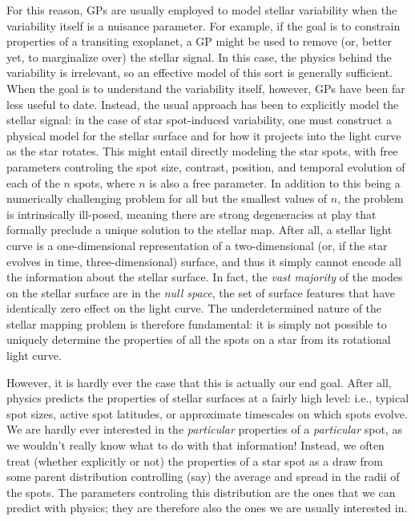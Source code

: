 \documentclass[modern]{aastex62}
\begin{document}
For this reason, GPs are usually employed to model stellar variability
when the variability itself is a nuisance parameter. For example, if the
goal is to constrain properties of a transiting exoplanet, a GP might be
used to remove (or, better yet, to marginalize over) the stellar signal.
In this case, the physics behind the variability is irrelevant, so an
effective model of this sort is generally sufficient. When the goal is to understand
the variability itself, however, GPs have been far less useful to date. Instead,
the usual approach has been to explicitly model the stellar signal: in the
case of star spot-induced variability, one must construct a physical model
for the stellar surface and for how it projects into the light curve as the
star rotates. This might entail directly modeling the star spots,
with free parameters controling the spot size, contrast, position,
and temporal evolution of each of the $n$ spots, where $n$ is also
a free parameter. In addition to this being a numerically challenging
problem for all but the smallest values of $n$, the problem is
intrinsically ill-posed, meaning there are strong degeneracies at play
that formally preclude a unique solution to the stellar map.
After all, a stellar light curve is a one-dimensional representation of a
two-dimensional (or, if the star evolves in time, three-dimensional)
surface, and thus it simply cannot encode all the information about the stellar surface.
In fact, the \emph{vast majority} of the modes on the stellar surface
are in the \emph{null space}, the set of surface features that have identically
zero effect on the light curve.
The underdetermined nature of the stellar mapping problem is therefore fundamental: it
is simply not possible to uniquely determine the properties of all the spots on
a star from its rotational light curve.

However, it is hardly ever the case that this is actually our end goal.
After all, physics predicts the properties of stellar surfaces at a fairly
high level: i.e., typical spot sizes, active spot latitudes, or approximate
timescales on which spots evolve. We are hardly ever interested in the
\emph{particular} properties of a \emph{particular} spot, as we wouldn't really
know what to do with that information! Instead, we often treat
(whether explicitly or not)
the properties of a star spot as a draw from some parent distribution
controlling (say) the average and spread in the radii of the spots.
The parameters controling this distribution are the ones that we can
predict with physics; they are therefore also the ones we are usually
interested in.
\end{document}
